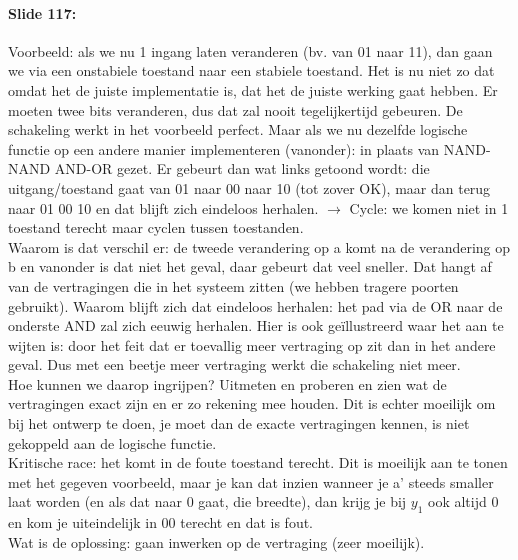 \documentclass[10pt,a4paper]{book}
\begin{document}
\paragraph{Slide 117:} Voorbeeld: als we nu 1 ingang laten veranderen (bv. van 01 naar 11), dan gaan we via een onstabiele toestand naar een stabiele toestand. Het is nu niet zo dat omdat het de juiste implementatie is, dat het de juiste werking gaat hebben. Er moeten twee bits veranderen, dus dat zal nooit tegelijkertijd gebeuren. De schakeling werkt in het voorbeeld perfect. Maar als we nu dezelfde logische functie op een andere manier implementeren (vanonder): in plaats van NAND-NAND AND-OR gezet. Er gebeurt dan wat links getoond wordt: die uitgang/toestand gaat van 01 naar 00 naar 10 (tot zover OK), maar dan terug naar 01 00 10 en dat blijft zich eindeloos herhalen. $\rightarrow$ Cycle: we komen niet in 1 toestand terecht maar cyclen tussen toestanden.\\
Waarom is dat verschil er: de tweede verandering op a komt na de verandering op b en vanonder is dat niet het geval, daar gebeurt dat veel sneller. Dat hangt af van de vertragingen die in het systeem zitten (we hebben tragere poorten gebruikt). Waarom blijft zich dat eindeloos herhalen: het pad via de OR naar de onderste AND zal zich eeuwig herhalen. Hier is ook ge\"illustreerd waar het aan te wijten is: door het feit dat er toevallig meer vertraging op zit dan in het andere geval. Dus met een beetje meer vertraging werkt die schakeling niet meer.\\
Hoe kunnen we daarop ingrijpen? Uitmeten en proberen en zien wat de vertragingen exact zijn en er zo rekening mee houden. Dit is echter moeilijk om bij het ontwerp te doen, je moet dan de exacte vertragingen kennen, is niet gekoppeld aan de logische functie.\\
Kritische race: het komt in de foute toestand terecht. Dit is moeilijk aan te tonen met het gegeven voorbeeld, maar je kan dat inzien wanneer je a' steeds smaller laat worden (en als dat naar 0 gaat, die breedte), dan krijg je bij $y_1$ ook altijd 0 en kom je uiteindelijk in 00 terecht en dat is fout.\\
Wat is de oplossing: gaan inwerken op de vertraging (zeer moeilijk).
\end{document}
